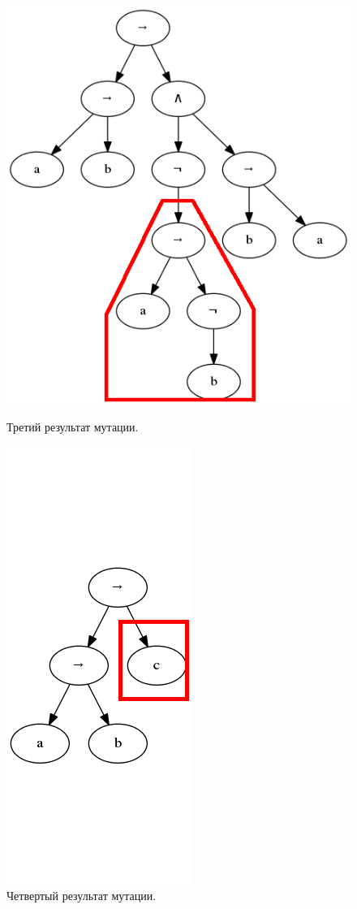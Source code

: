 \documentclass[12pt,fleqn]{article}
\begin{document}
\begin{figure}[!h]%
  \centering
  \begin{minipage}{2in}%
    \centering
    \includegraphics[scale=0.3]{t8.png}
    \caption{Третий результат мутации.}
  \end{minipage}%
  \qquad
  \begin{minipage}{2in}%
    \centering
    \includegraphics[scale=0.3]{t9.png}
    \caption{Четвертый результат мутации.}
  \end{minipage}%
\end{figure}
\end{document}
